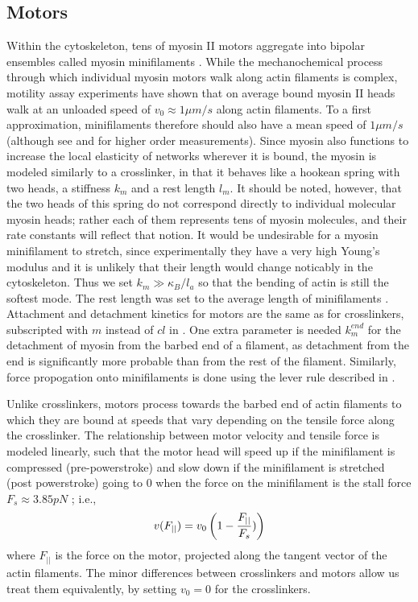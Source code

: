 \documentclass[12pt]{article}
\begin{document}
\subsection{Motors}\label{sec:methods_motors}
Within the cytoskeleton, tens of myosin II motors aggregate into bipolar ensembles called myosin minifilaments
\cite{stam2015}. While the mechanochemical process through which individual myosin motors walk along actin filaments is complex, 
motility assay experiments have shown that on average bound myosin II heads walk at an unloaded speed of $v_0\approx1\mu m/s$ along actin
filaments\cite{finer1994}. To a first approximation, minifilaments therefore should also 
have a mean speed of $1\mu m/s$ (although see \cite{stam2015} and \cite{walcott2012} for higher order measurements). 
Since myosin also functions to increase the local elasticity of networks wherever it is bound, the myosin is modeled
similarly to a crosslinker, in that it behaves like a hookean spring with two heads, a stiffness $k_{m}$ and a rest
length $l_m$. It should be noted, however, that the two heads of this spring do not correspond directly to individual
molecular myosin heads; rather each of them represents tens of myosin molecules, and their rate constants will reflect
that notion. 
It would be undesirable for a myosin minifilament to stretch, 
since experimentally they have a very high
Young's modulus and it is unlikely that their length would change noticably in the cytoskeleton. Thus we set $k_m\gg\kappa_B/l_a$
so that the bending of actin is still the softest mode. 
The rest length was set to the average length of minifilaments \cite{niederman1975}.
Attachment and detachment kinetics for motors are the same as for crosslinkers, subscripted with $m$
instead of $cl$ in . One extra parameter is needed $k_m^{end}$ for the
detachment of myosin from the barbed end of a filament, as detachment from the end is significantly more probable than
from the rest of the filament.
Similarly, force propogation onto minifilaments is done using the lever rule described in .
\par
Unlike crosslinkers, motors process towards the barbed end of actin filaments to which they are bound 
at speeds that vary depending on the tensile force along the crosslinker. 
The relationship between motor velocity and tensile force is modeled linearly, such that the motor head 
will speed up if the minifilament is
compressed (pre-powerstroke) and slow down if the minifilament is stretched (post powerstroke) going to
$0$ when the force on the minifilament is the stall force $F_s\approx 3.85pN$ \cite{nedelec2002, gordon2012}; i.e.,  
\begin{equation} 
  v(F_{||}) = v_0\left( 1-{F_{||}\over F_s}) \right)
    \label{eqn:myo_vel}
\end{equation} 
where $F_{||}$ is the force on the motor, projected along the tangent vector of the
actin filaments.
The minor differences between crosslinkers and motors allow us treat them equivalently, by 
setting $v_0 = 0$ for the crosslinkers.  
\end{document}
